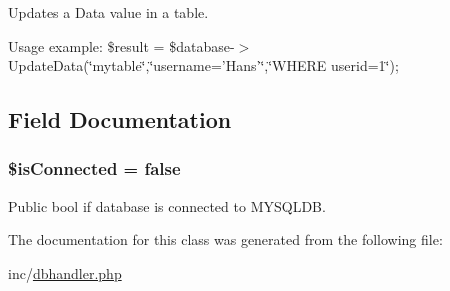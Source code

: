 Updates a Data value in a table. 

Usage example\-: \$result = \$database-\/$>$Update\-Data(\char`\"{}mytable\char`\"{},\char`\"{}username='\-Hans'\char`\"{},\char`\"{}\-W\-H\-E\-R\-E userid=1\char`\"{}); 

\subsection{Field Documentation}
\hypertarget{class_u_e4_a_m___d_b_handler_a50ceed0b08e9ad3dcaecc2ac188b2047}{
\subsubsection[{\$is\-Connected}]{\setlength{\rightskip}{0pt plus 5cm}\$is\-Connected = false}}\label{class_u_e4_a_m___d_b_handler_a50ceed0b08e9ad3dcaecc2ac188b2047}


Public bool if database is connected to M\-Y\-S\-Q\-L\-D\-B. 



The documentation for this class was generated from the following file\-:\begin{DoxyCompactItemize}
\item 
inc/\hyperlink{dbhandler_8php}{dbhandler.\-php}\end{DoxyCompactItemize}
